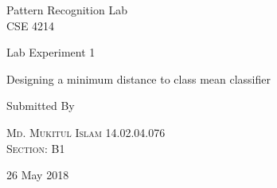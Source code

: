 \begin{titlepage} %

	\centering %
	
	\scshape %
	
	\vspace*{\baselineskip} %
	
	
	\vspace{0.75\baselineskip} %
	
	{\LARGE Pattern Recognition Lab\\} %
	{\LARGE CSE 4214\\} %
	
	
	\vspace{5\baselineskip} %
	
	{\LARGE Lab Experiment 1\\}
	\vspace{1\baselineskip} %
	
	\vspace{1\baselineskip} %
	{\LARGE Designing a minimum distance to class mean classifier}
	
	\vspace{5\baselineskip} %
	
	
	\LARGE Submitted By
	
	\vspace{0.5\baselineskip} %
	
	{\scshape\Large Md. Mukitul Islam \hspace{5pt} 14.02.04.076\\} %
	\vspace{2\baselineskip} %
	{\scshape\Large Section: \hspace{5pt}B1\\}
	\vspace{3\baselineskip} %
	
	26 May 2018
	

	\vfill %
	



\end{titlepage}
